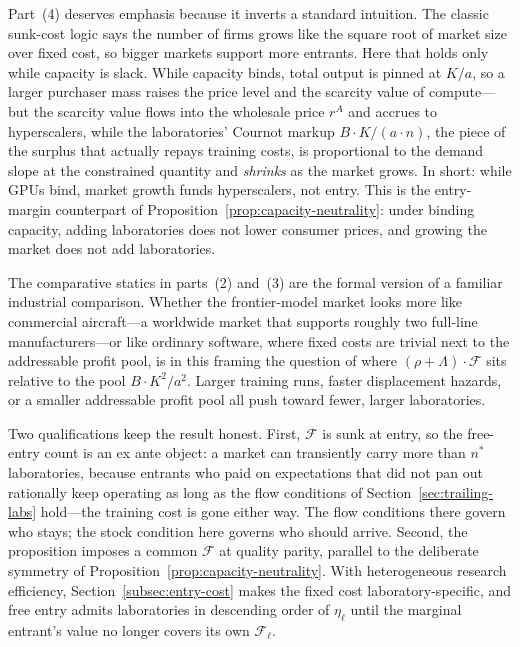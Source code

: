 \documentclass[11pt]{article}
\begin{document}
Part~(4) deserves emphasis because it inverts a standard intuition. The classic sunk-cost logic says the number of firms grows like the square root of market size over fixed cost, so bigger markets support more entrants. Here that holds only while capacity is slack. While capacity binds, total output is pinned at $K/a$, so a larger purchaser mass raises the price level and the scarcity value of compute---but the scarcity value flows into the wholesale price $r^{A}$ and accrues to hyperscalers, while the laboratories' Cournot markup $B\cdot K/(a\cdot n)$, the piece of the surplus that actually repays training costs, is proportional to the demand slope at the constrained quantity and \emph{shrinks} as the market grows. In short: while GPUs bind, market growth funds hyperscalers, not entry. This is the entry-margin counterpart of Proposition~\ref{prop:capacity-neutrality}: under binding capacity, adding laboratories does not lower consumer prices, and growing the market does not add laboratories.

The comparative statics in parts~(2) and~(3) are the formal version of a familiar industrial comparison. Whether the frontier-model market looks more like commercial aircraft---a worldwide market that supports roughly two full-line manufacturers---or like ordinary software, where fixed costs are trivial next to the addressable profit pool, is in this framing the question of where $(\rho+\Lambda)\cdot\mathcal F$ sits relative to the pool $B\cdot K^{2}/a^{2}$. Larger training runs, faster displacement hazards, or a smaller addressable profit pool all push toward fewer, larger laboratories.

Two qualifications keep the result honest. First, $\mathcal F$ is sunk at entry, so the free-entry count is an ex ante object: a market can transiently carry more than $n^{*}$ laboratories, because entrants who paid on expectations that did not pan out rationally keep operating as long as the flow conditions of Section~\ref{sec:trailing-labs} hold---the training cost is gone either way. The flow conditions there govern who stays; the stock condition here governs who should arrive. Second, the proposition imposes a common $\mathcal F$ at quality parity, parallel to the deliberate symmetry of Proposition~\ref{prop:capacity-neutrality}. With heterogeneous research efficiency, Section~\ref{subsec:entry-cost} makes the fixed cost laboratory-specific, and free entry admits laboratories in descending order of $\eta_\ell$ until the marginal entrant's value no longer covers its own $\mathcal F_\ell$.
\end{document}
